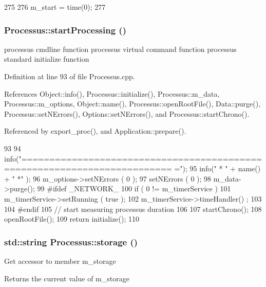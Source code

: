 \begin{DoxyCode}
275                     {
276     m_start = time(0);
277   }
\end{DoxyCode}
\hypertarget{classProcessus_a09319bde9bed93e290f69b4e04585543}{
\subsubsection[{startProcessing}]{ Processus::startProcessing ()}}
\label{classProcessus_a09319bde9bed93e290f69b4e04585543}
processus cmdline function processus virtual command function processus standard initialize function 

Definition at line 93 of file Processus.cpp.

References Object::info(), Processus::initialize(), Processus::m\_\-data, Processus::m\_\-options, Object::name(), Processus::openRootFile(), Data::purge(), Processus::setNErrors(), Options::setNErrors(), and Processus::startChrono().

Referenced by export\_\-proc(), and Application::prepare().


\begin{DoxyCode}
93                                       {
94   info("=========================================================================
      =");
95   info("   * " + name() + " *" );
96   m_options->setNErrors ( 0 );
97   setNErrors ( 0 );
98   m_data->purge();
99 #ifdef _NETWORK_
100   if ( 0 != m_timerService ){
101     m_timerService->setRunning ( true );
102     m_timerService->timeHandler() ;
103   }
104 #endif
105   // start measuring processus duration
106   
107   startChrono();
108   openRootFile();
109   return initialize();
110 }
\end{DoxyCode}
\hypertarget{classProcessus_a33fa1a0b54a636e5cdd680669fd9ea51}{
\subsubsection[{storage}]{\setlength{\rightskip}{0pt plus 5cm}std::string Processus::storage ()}}
\label{classProcessus_a33fa1a0b54a636e5cdd680669fd9ea51}
Get accessor to member m\_\-storage \begin{DoxyReturn}{Returns}
the current value of m\_\-storage 
\end{DoxyReturn}


